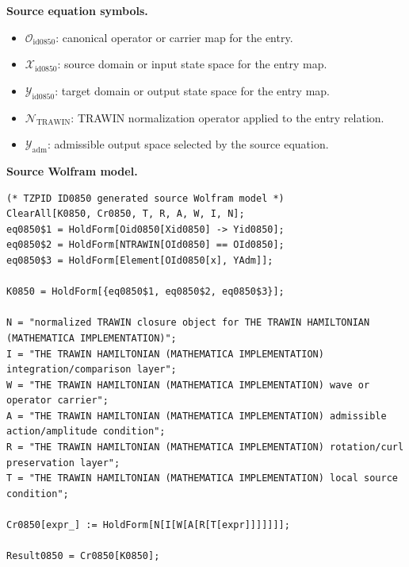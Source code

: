 \begin{minipage}[t]{0.49\linewidth}
\begingroup
\small
\raggedright
\textbf{Source equation symbols.}\par
\begin{itemize}[leftmargin=1.35em,itemsep=1pt,topsep=1pt,parsep=0pt]
    \item $\mathcal{O}_{\mathrm{id0850}}$: canonical operator or carrier map for the entry.
    \item $\mathcal{X}_{\mathrm{id0850}}$: source domain or input state space for the entry map.
    \item $\mathcal{Y}_{\mathrm{id0850}}$: target domain or output state space for the entry map.
    \item $\mathcal{N}_{\mathrm{TRAWIN}}$: TRAWIN normalization operator applied to the entry relation.
    \item $\mathcal{Y}_{\mathrm{adm}}$: admissible output space selected by the source equation.
\end{itemize}
\endgroup
\end{minipage}\hfill
\begin{minipage}[t]{0.47\linewidth}
\begingroup
\scriptsize
\raggedright
\textbf{Source Wolfram model.}\par
\begin{Verbatim}[fontsize=\tiny,breaklines=true,breakanywhere=true]
(* TZPID ID0850 generated source Wolfram model *)
ClearAll[K0850, Cr0850, T, R, A, W, I, N];
eq0850$1 = HoldForm[Oid0850[Xid0850] -> Yid0850];
eq0850$2 = HoldForm[NTRAWIN[OId0850] == OId0850];
eq0850$3 = HoldForm[Element[OId0850[x], YAdm]];

K0850 = HoldForm[{eq0850$1, eq0850$2, eq0850$3}];

N = "normalized TRAWIN closure object for THE TRAWIN HAMILTONIAN (MATHEMATICA IMPLEMENTATION)";
I = "THE TRAWIN HAMILTONIAN (MATHEMATICA IMPLEMENTATION) integration/comparison layer";
W = "THE TRAWIN HAMILTONIAN (MATHEMATICA IMPLEMENTATION) wave or operator carrier";
A = "THE TRAWIN HAMILTONIAN (MATHEMATICA IMPLEMENTATION) admissible action/amplitude condition";
R = "THE TRAWIN HAMILTONIAN (MATHEMATICA IMPLEMENTATION) rotation/curl preservation layer";
T = "THE TRAWIN HAMILTONIAN (MATHEMATICA IMPLEMENTATION) local source condition";

Cr0850[expr_] := HoldForm[N[I[W[A[R[T[expr]]]]]]];

Result0850 = Cr0850[K0850];
\end{Verbatim}
\endgroup
\end{minipage}

